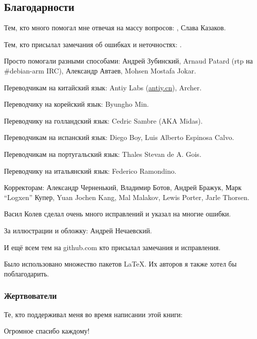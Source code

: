 \subsection*{Благодарности}

Тем, кто много помогал мне отвечая на массу вопросов: \HERMIT, Слава  Казаков.

Тем, кто присылал замечания об ошибках и неточностях: \PeopleMistakesInaccuracies{}.

Просто помогали разными способами:
Андрей Зубинский,
Arnaud Patard (rtp на \#debian-arm IRC),
Александр Автаев,
Mohsen Mostafa Jokar.

Переводчикам на китайский язык:
Antiy Labs (\href{http://antiy.cn}{antiy.cn}), Archer.

Переводчику на корейский язык: Byungho Min.

Переводчику на голландский язык: Cedric Sambre (AKA Midas).

Переводчикам на испанский язык: Diego Boy, Luis Alberto Espinosa Calvo.

Переводчикам на португальский язык: Thales Stevan de A. Gois.

Переводчику на итальянский язык: Federico Ramondino.

Корректорам:
Александр  Черненький,
Владимир Ботов,
Андрей Бражук,
Марк ``Logxen'' Купер, Yuan Jochen Kang, Mal Malakov, Lewis Porter, Jarle Thorsen.

Васил Колев сделал очень много исправлений и указал на многие ошибки.

За иллюстрации и обложку: Андрей Нечаевский.

И ещё всем тем на github.com кто присылал замечания и исправления.

Было использовано множество пакетов \LaTeX. Их авторов я также хотел бы поблагодарить.

\subsubsection*{Жертвователи}

Те, кто поддерживал меня во время написании этой книги:



Огромное спасибо каждому!

